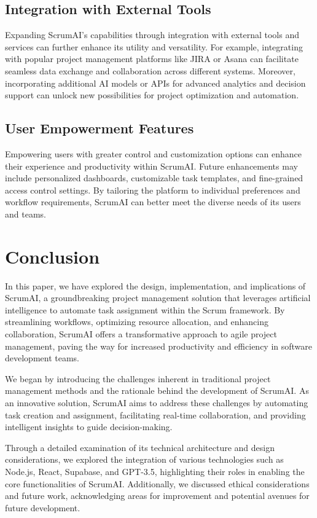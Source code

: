 \documentclass[conference]{IEEEtran}
\begin{document}
\subsection{Integration with External Tools}
Expanding ScrumAI's capabilities through integration with external tools and services can further enhance its utility and versatility. For example, integrating with popular project management platforms like JIRA or Asana can facilitate seamless data exchange and collaboration across different systems. Moreover, incorporating additional AI models or APIs for advanced analytics and decision support can unlock new possibilities for project optimization and automation.

\subsection{User Empowerment Features}
Empowering users with greater control and customization options can enhance their experience and productivity within ScrumAI. Future enhancements may include personalized dashboards, customizable task templates, and fine-grained access control settings. By tailoring the platform to individual preferences and workflow requirements, ScrumAI can better meet the diverse needs of its users and teams.


\section{Conclusion}
In this paper, we have explored the design, implementation, and implications of ScrumAI, a groundbreaking project management solution that leverages artificial intelligence to automate task assignment within the Scrum framework. By streamlining workflows, optimizing resource allocation, and enhancing collaboration, ScrumAI offers a transformative approach to agile project management, paving the way for increased productivity and efficiency in software development teams.

We began by introducing the challenges inherent in traditional project management methods and the rationale behind the development of ScrumAI. As an innovative solution, ScrumAI aims to address these challenges by automating task creation and assignment, facilitating real-time collaboration, and providing intelligent insights to guide decision-making.

Through a detailed examination of its technical architecture and design considerations, we explored the integration of various technologies such as Node.js, React, Supabase, and GPT-3.5, highlighting their roles in enabling the core functionalities of ScrumAI. Additionally, we discussed ethical considerations and future work, acknowledging areas for improvement and potential avenues for future development.
\end{document}
